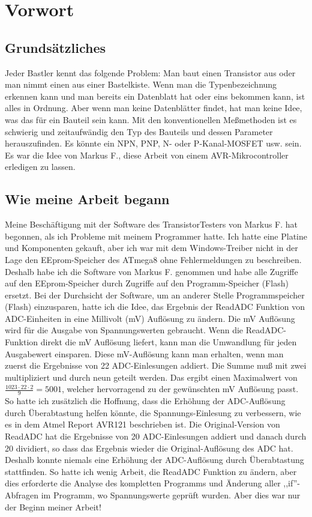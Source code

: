 \section*{Vorwort}

\subsection*{Grundsätzliches}
Jeder Bastler kennt das folgende Problem: Man baut einen Transistor aus oder man nimmt einen aus einer Bastelkiste.
Wenn man die Typenbezeichnung erkennen kann und man bereits ein Datenblatt hat oder eins bekommen kann, ist alles in Ordnung.
Aber wenn man keine Datenblätter findet, hat man keine Idee, was das für ein Bauteil sein kann.
Mit den konventionellen Meßmethoden ist es schwierig und zeitaufwändig den Typ des Bauteils und dessen Parameter herauszufinden.
Es könnte ein NPN, PNP, N- oder P-Kanal-MOSFET usw. sein. 
Es war die Idee von Markus F., diese Arbeit von einem AVR-Mikrocontroller erledigen zu lassen.

\subsection*{Wie meine Arbeit begann}
Meine Beschäftigung mit der Software des TransistorTesters von Markus F. \cite{Frejek} hat begonnen, als ich Probleme mit
meinem Programmer hatte.
Ich hatte eine Platine und Komponenten gekauft, aber ich war mit dem Windows-Treiber nicht in der Lage den EEprom-Speicher des ATmega8
ohne Fehlermeldungen zu beschreiben.
Deshalb habe ich die Software von Markus F. genommen und habe alle Zugriffe auf den EEprom-Speicher durch
Zugriffe auf den Programm-Speicher (Flash) ersetzt.
Bei der Durchsicht der Software, um an anderer Stelle Programmspeicher (Flash) einzusparen, hatte ich die Idee,
das Ergebnis der ReadADC Funktion von ADC-Einheiten in eine Millivolt (mV) Auflösung zu ändern.
Die mV Auflösung wird für die Ausgabe von Spannungswerten gebraucht.
Wenn die ReadADC-Funktion direkt die mV Auflösung liefert, kann man die Umwandlung für jeden
Ausgabewert einsparen.
Diese mV-Auflösung kann man erhalten, wenn man zuerst die Ergebnisse von 22 ADC-Einlesungen addiert.
Die Summe muß mit zwei multipliziert und durch neun geteilt werden.
Das ergibt einen Maximalwert von \begin{math}\frac{1023\cdot22\cdot2}{9} = 5001\end{math},
welcher hervorragend zu der gewünschten mV Auflösung passt.
So hatte ich zusätzlich die Hoffnung, dass die Erhöhung der ADC-Auflösung durch Überabtastung helfen
könnte, die Spannungs-Einlesung zu verbessern, wie es in dem Atmel Report AVR121 \cite{AVR121} beschrieben ist.
Die Original-Version von ReadADC hat die Ergebnisse von 20 ADC-Einlesungen addiert und danach durch 20 dividiert,
so dass das Ergebnis wieder die Original-Auflösung des ADC hat. Deshalb konnte niemals eine Erhöhung der ADC-Auflösung
durch Überabtastung stattfinden.
So hatte ich wenig Arbeit, die ReadADC Funktion zu ändern, aber dies erforderte die Analyse des kompletten
Programms und Änderung aller ,,if''-Abfragen im Programm, wo Spannungswerte geprüft wurden.
Aber dies war nur der Beginn meiner Arbeit!

